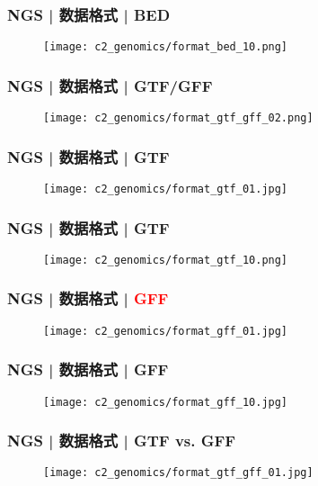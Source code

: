 \begin{frame}
  \frametitle{NGS | 数据格式 | BED}
  \begin{figure}
    \centering
    \texttt{[image: c2\_genomics/format\_bed\_10.png]}
  \end{figure}
\end{frame}

\begin{frame}
  \frametitle{NGS | 数据格式 | GTF/GFF}
  \begin{figure}
    \centering
    \texttt{[image: c2\_genomics/format\_gtf\_gff\_02.png]}
  \end{figure}
\end{frame}

\begin{frame}
  \frametitle{NGS | 数据格式 | GTF}
  \begin{figure}
    \centering
    \texttt{[image: c2\_genomics/format\_gtf\_01.jpg]}
  \end{figure}
\end{frame}

\begin{frame}
  \frametitle{NGS | 数据格式 | GTF}
  \begin{figure}
    \centering
    \texttt{[image: c2\_genomics/format\_gtf\_10.png]}
  \end{figure}
\end{frame}

\begin{frame}
  \frametitle{NGS | 数据格式 | \textcolor{red}{GFF}}
  \begin{figure}
    \centering
    \texttt{[image: c2\_genomics/format\_gff\_01.jpg]}
  \end{figure}
\end{frame}

\begin{frame}
  \frametitle{NGS | 数据格式 | GFF}
  \begin{figure}
    \centering
    \texttt{[image: c2\_genomics/format\_gff\_10.jpg]}
  \end{figure}
\end{frame}

\begin{frame}
  \frametitle{NGS | 数据格式 | GTF vs. GFF}
  \begin{figure}
    \centering
    \texttt{[image: c2\_genomics/format\_gtf\_gff\_01.jpg]}
  \end{figure}
\end{frame}

